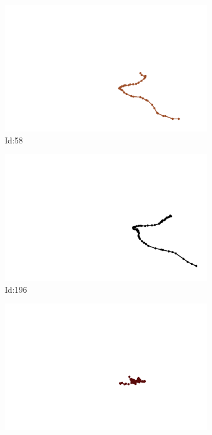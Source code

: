 \documentclass[12pt,twoside]{report}
\begin{document}
\begin{figure}
\centering
\begin{subfigure}[b]{0.20\textwidth}
\centering
\includegraphics[width=\textwidth]{../../trajectories/58.png}
\caption{Id:58}
\end{subfigure}
\begin{subfigure}[b]{0.20\textwidth}
\centering
\includegraphics[width=\textwidth]{../../trajectories/196.png}
\caption{Id:196}
\end{subfigure}
\begin{subfigure}[b]{0.20\textwidth}
\centering
\includegraphics[width=\textwidth]{../../trajectories/369.png}

\end{subfigure}
\end{figure}
\end{document}
